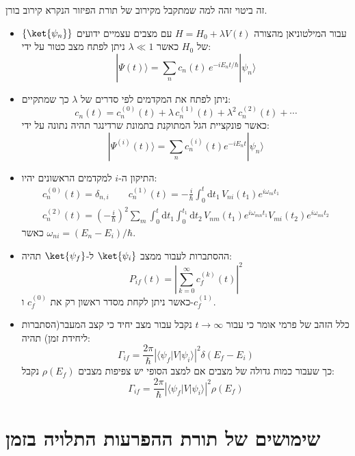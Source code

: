 \documentclass{tstextbook}
\begin{document}
\begin{remark}
זה ביטוי זהה למה שמתקבל מקירוב של תורת הפיזור הנקרא קירוב בורן.

\end{remark}
\begin{summary}
  \begin{itemize}
    \item עבור המילטוניאן מהצורה \(H=H_{0}+\lambda V(t)\) עם מצבים עצמיים ידועים \(\left\{  \ket{\psi_{n}}  \right\}\) של \(H_{0}\) כאשר \(\lambda\ll 1\) ניתן לפתח מצב כטור על ידי:
$$|\Psi(t)\rangle=\sum_{n}c_{n}(t)\,e^{-i E_{n}t/\hbar}|\psi_{n}\rangle$$
    \item ניתן לפתח את המקדמים לפי סדרים של \(\lambda\) כך שמתקיים:
$$c_{n}(t)=c_{n}^{(0)}(t)+\lambda\,c_{n}^{(1)}(t)+\lambda^{2}\,c_{n}^{(2)}(t)+\cdots$$
כאשר פונקציית הגל המתוקנת בתמונת שרדינגר תהיה נתונה על ידי:
$$|\Psi^{(i)}(t)\rangle=\sum_{n}c_{n}^{(i)}(t)e^{-i E_{n}t}|\psi_{n}\rangle$$
    \item התיקון ה-\(i\) למקדמים הראשונים יהיו:
\begin{gather*}c_{n}^{(0)}(t)=\delta_{n,i}\qquad  c_{n}^{(1)}(t)=-\frac{i}{\hbar}\int_{0}^{t}\mathrm{d} t_{1}\,V_{n i}(t_{1})e^{i\omega_{n i}t_{1}}\\c_{n}^{(2)}(t)=\left(-\frac{i}{\hbar}\right)^{2}\sum_{m}\int_{0}^{t}\mathrm{d} t_{1}\int_{0}^{t_{1}}\mathrm{d} t_{2}\,V_{n m}(t_{1})e^{i\omega_{m n}t_{1}}V_{m i}(t_{2})e^{i\omega_{m i}t_{2}} 
\end{gather*}
כאשר \(\omega_{ni}=(E_{n}-E_{i}) / \hbar\).
    \item ההסתברות לעבור ממצב \(\ket{\psi_{i}}\) ל-\(\ket{\psi_{f}}\) תהיה:
$$P_{i f}(t)=\left|\sum_{k=0}^{\infty}c_{f}^{(k)}(t)\right|^{2}$$
כאשר ניתן לקחת מסדר ראשון רק את \(c_{f}^{(0)}\) ו-\(c^{(1)}_{f}\).
    \item כלל הזהב של פרמי אומר כי עבור \(t\to \infty\) נקבל עבור מצב יחיד כי קצב המעבר(הסתברות ליחידת זמן) תהיה:
$$\Gamma_{i f}=\frac{2\pi}{\hbar}\left|\langle\psi_{f}|V|\psi_{i}\rangle\right|^{2}\delta(E_{f}-E_{i})$$
כך שעבור כמות גדולה של מצבים אם למצב הסופי יש צפיפות מצבים \(\rho(E_{f})\) נקבל:
$$\Gamma_{i f}=\frac{2\pi}{\hbar}\left|\langle\psi_{f}|V|\psi_{i}\rangle\right|^{2}\rho(E_{f})$$
  \end{itemize}
\end{summary}
\section{שימושים של תורת ההפרעות התלויה בזמן}
\end{document}
